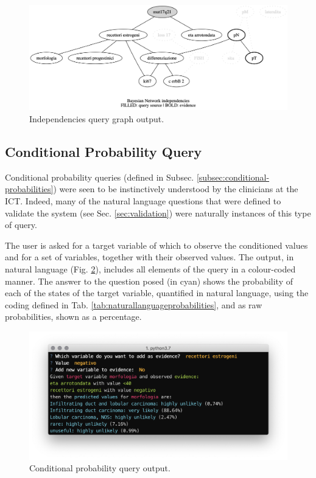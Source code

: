 \begin{figure}[htbp]
\centerline{\includegraphics[width=\columnwidth]{results/images/independencies_output}}
\caption{Independencies query graph output.}
\label{fig:independencies_output}
\end{figure}

\subsection{Conditional Probability Query}
Conditional probability queries (defined in Subsec. \ref{subsec:conditional-probabilities}) were seen to be instinctively understood by the clinicians at the ICT.
Indeed, many of the natural language questions that were defined to validate the system (see Sec. \ref{sec:validation}) were naturally instances of this type of query.

The user is asked for a target variable of which to observe the conditioned values and for a set of variables, together with their observed values.
The output, in natural language (Fig. \ref{fig:sw_3_query}), includes all elements of the query in a colour-coded manner.
The answer to the question posed (in cyan) shows the probability of each of the states of the target variable, quantified in natural language, using the coding defined in Tab. \ref{tab:naturallanguageprobabilities}, and as raw probabilities, shown as a percentage.

\begin{figure}[htbp]
\centerline{\includegraphics[width=\columnwidth]{results/images/sw_3_query}}
\caption{Conditional probability query output.}
\label{fig:sw_3_query}
\end{figure}

